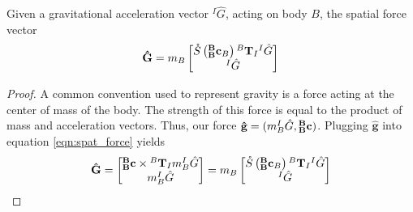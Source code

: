 \begin{lemma}
	Given a gravitational acceleration vector $^I\hat{G}$, acting on body $B$, the spatial force vector 
	\begin{align*}
		\mathbf{\hat{G}} = m_B\begin{bmatrix} 
		\mathring{S}\left(^\mathbf{B}_\mathbf{B}\mathbf{c}_B\right){^B\mathbf{T}_I}{^I\hat{G}}      \\ {^I\hat{G}}
		\end{bmatrix}                         
	\end{align*}
	\begin{proof}
		\noindent A common convention used to represent gravity is a force acting at the center of mass of the body. The strength of this force is equal to the product of mass and acceleration vectors. Thus, our force $\mathbf{\hat{g}} = (m_B^I\hat{G},  {^\mathbf{B}_\mathbf{B}}\mathbf{c})$. Plugging $\mathbf{\hat{g}}$ into equation \ref{eqn:spat_force} yields
		\begin{align*}
			\mathbf{\hat{G}} = \begin{bmatrix}      
			{{^\mathbf{B}_\mathbf{B}}}\mathbf{c} \times {^B\mathbf{T}_I}m_B^I\hat{G} \\ m_B^I\hat{G} 
			\end{bmatrix} = m_B\begin{bmatrix}      
			\mathring{S}\left(^\mathbf{B}_\mathbf{B}\mathbf{c}_B\right){^B\mathbf{T}_I}{^I\hat{G}}        \\ {^I\hat{G}}
			\end{bmatrix}                           
		\end{align*}
	\end{proof}
\end{lemma}